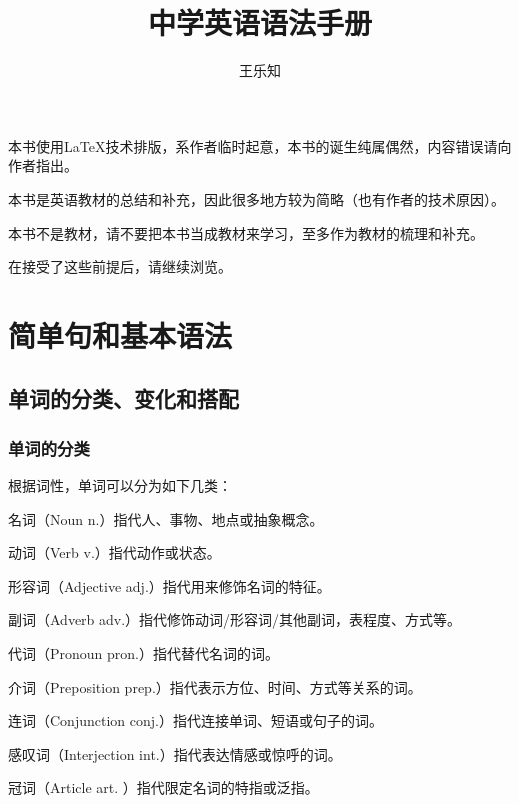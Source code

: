 \documentclass[UTF8]{ctexbook}
\title{中学英语语法手册}
\author{王乐知}
\begin{document}
\maketitle

\begin{center}
{}
\end{center}

本书使用\LaTeX{}技术排版，系作者临时起意，本书的诞生纯属偶然，内容错误请向作者指出。

本书是英语教材的总结和补充，因此很多地方较为简略（也有作者的技术原因）。

本书不是教材，请不要把本书当成教材来学习，至多作为教材的梳理和补充。

在接受了这些前提后，请继续浏览。

\tableofcontents

\part{简单句和基本语法}

\chapter{单词的分类、变化和搭配}

{}

\section{单词的分类}

根据词性，单词可以分为如下几类：

名词（Noun n.）指代人、事物、地点或抽象概念。

动词（Verb v.）指代动作或状态。

形容词（Adjective adj.）指代用来修饰名词的特征。

副词（Adverb adv.）指代修饰动词/形容词/其他副词，表程度、方式等。

代词（Pronoun pron.）指代替代名词的词。

介词（Preposition prep.）指代表示方位、时间、方式等关系的词。

连词（Conjunction conj.）指代连接单词、短语或句子的词。

感叹词（Interjection int.）指代表达情感或惊呼的词。

冠词（Article art. ）指代限定名词的特指或泛指。
\end{document}
